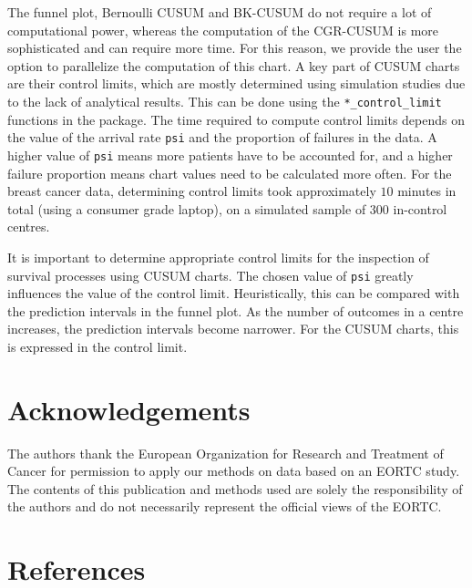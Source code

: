 The funnel plot, Bernoulli CUSUM and BK-CUSUM do not require a lot of computational power, whereas the computation of the CGR-CUSUM is more sophisticated and can require more time. For this reason, we provide the user the option to parallelize the computation of this chart. A key part of CUSUM charts are their control limits, which are mostly determined using simulation studies due to the lack of analytical results. This can be done using the \texttt{*\_control\_limit} functions in the  package. The time required to compute control limits depends on the value of the arrival rate \texttt{psi} and the proportion of failures in the data. A higher value of \texttt{psi} means more patients have to be accounted for, and a higher failure proportion means chart values need to be calculated more often. For the breast cancer data, determining control limits took approximately \(10\) minutes in total (using a consumer grade laptop), on a simulated sample of \(300\) in-control centres.

It is important to determine appropriate control limits for the inspection of survival processes using CUSUM charts. The chosen value of \texttt{psi} greatly influences the value of the control limit. Heuristically, this can be compared with the prediction intervals in the funnel plot. As the number of outcomes in a centre increases, the prediction intervals become narrower. For the CUSUM charts, this is expressed in the control limit.

\hypertarget{acknowledgements}{%
\section{Acknowledgements}\label{acknowledgements}}

The authors thank the European Organization for Research and Treatment of Cancer for permission to apply our methods on data based on an EORTC study. The contents of this publication and methods used are solely the responsibility of the authors and do not necessarily represent the official views of the EORTC.

\hypertarget{references}{%
\section*{References}\label{references}}

